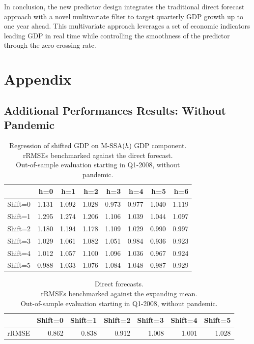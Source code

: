 \documentclass[11pt,a4paper]{article}
\begin{document}
In conclusion, the new predictor design integrates the traditional direct forecast approach with a novel multivariate filter to target quarterly GDP growth up to one year ahead. This multivariate approach leverages a set of economic indicators leading GDP in real time while controlling the smoothness of the predictor through the zero-crossing rate. 




\newpage
\section{Appendix}\label{sec:Appendix}

\subsection{Additional Performances Results: Without Pandemic}


\begin{table}[ht]
\centering
\begin{tabular}{rrrrrrrr}
  \hline
 & h=0 & h=1 & h=2 & h=3 & h=4 & h=5 & h=6 \\ 
  \hline
Shift=0 & 1.131 & 1.092 & 1.028 & 0.973 & 0.977 & 1.040 & 1.119 \\ 
  Shift=1 & 1.295 & 1.274 & 1.206 & 1.106 & 1.039 & 1.044 & 1.097 \\ 
  Shift=2 & 1.180 & 1.194 & 1.178 & 1.109 & 1.029 & 0.990 & 0.997 \\ 
  Shift=3 & 1.029 & 1.061 & 1.082 & 1.051 & 0.984 & 0.936 & 0.923 \\ 
  Shift=4 & 1.012 & 1.057 & 1.100 & 1.096 & 1.036 & 0.967 & 0.924 \\ 
  Shift=5 & 0.988 & 1.033 & 1.076 & 1.084 & 1.048 & 0.987 & 0.929 \\  
   \hline
\end{tabular}
\caption{Regression of shifted GDP on M-SSA($h$) GDP component.\\rRMSEs benchmarked against the direct forecast.\\Out-of-sample evaluation starting in Q1-2008, without pandemic.} 
\label{rRMSE_mSSA_comp_direct_without_covid7}
\end{table}%
\begin{table}[ht]
\centering
\begin{tabular}{rrrrrrr}
  \hline
 & Shift=0 & Shift=1 & Shift=2 & Shift=3 & Shift=4 & Shift=5 \\ 
  \hline
rRMSE & 0.862 & 0.838 & 0.912 & 1.008 & 1.001 & 1.028 \\  
   \hline
\end{tabular}
\caption{Direct forecasts.\\
rRMSEs benchmarked against the expanding mean.\\Out-of-sample evaluation starting in Q1-2008, without pandemic.} 
\label{rRMSE_mSSA_direct_mean_without_covid8}
\end{table}
\end{document}
